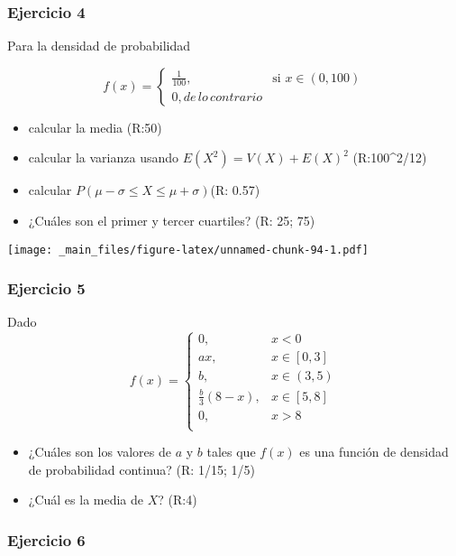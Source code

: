 \documentclass[
]{book}
\providecommand{\tightlist}{%
  \setlength{\itemsep}{0pt}\setlength{\parskip}{0pt}}
\begin{document}
\hypertarget{ejercicio-4-1}{%
\subsubsection{Ejercicio 4}\label{ejercicio-4-1}}

Para la densidad de probabilidad

\[
    f(x)=
\begin{cases}
    \frac{1}{100},& \text{si } x\in (0,100)\\
    0, de\, lo\, contrario
\end{cases}
\]

\begin{itemize}
\tightlist
\item
  calcular la media (R:50)
\item
  calcular la varianza usando \(E(X^2)=V(X)+E(X)^2\) (R:100\^{}2/12)
\item
  calcular \(P(\mu-\sigma\leq X \leq \mu+\sigma)\)(R: 0.57)
\item
  ¿Cuáles son el primer y tercer cuartiles? (R: 25; 75)
\end{itemize}

\texttt{[image: \_main\_files/figure-latex/unnamed-chunk-94-1.pdf]}

\hypertarget{ejercicio-5-1}{%
\subsubsection{Ejercicio 5}\label{ejercicio-5-1}}

Dado
\[
    f(x)= 
\begin{cases}
0, & x < 0 \\
ax, & x \in [0,3] \\
b, & x \in (3,5) \\
\frac{b}{3}(8-x),& x \in [5,8]\\
0, & x > 8 \\
\end{cases}
\]

\begin{itemize}
\item
  ¿Cuáles son los valores de \(a\) y \(b\) tales que \(f(x)\) es una función de densidad de probabilidad continua? (R: 1/15; 1/5)
\item
  ¿Cuál es la media de \(X\)? (R:4)
\end{itemize}

\hypertarget{ejercicio-6}{%
\subsubsection{Ejercicio 6}\label{ejercicio-6}}
\end{document}
